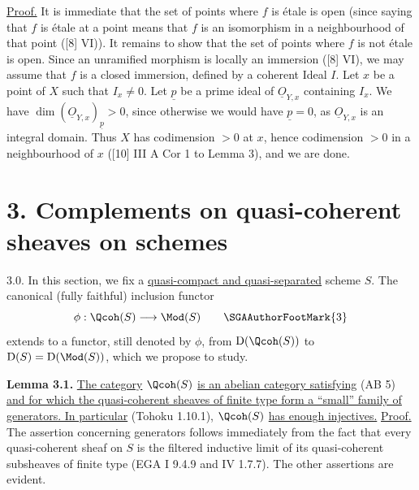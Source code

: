 \uline{Proof.} It is immediate that the set of points where $f$ is étale is open (since saying that $f$ is étale at a point means that $f$ is an isomorphism in a neighbourhood of that point ([8] VI)). It remains to show that the set of points where $f$ is not étale is open. Since an unramified morphism is locally an immersion ([8] VI), we may assume that $f$ is a closed immersion, defined by a coherent Ideal $I$. Let $x$ be a point of $X$ such that $I_x\ne0$. Let $\underline{p}$ be a prime ideal of $\underline{O}_{Y,x}$ containing $I_x$. We have $\dim(\underline{O}_{Y,x})_{\underline{p}}>0$, since otherwise we would have $\underline{p}=0$, as $\underline{O}_{Y,x}$ is an integral domain. Thus $X$ has codimension $>0$ at $x$, hence codimension $>0$ in a neighbourhood of $x$ ([10] III A Cor 1 to Lemma 3), and we are done.

\section*{3. Complements on quasi-coherent sheaves on schemes\protect{}}

3.0. In this section, we fix a \uline{quasi-compact and quasi-separated} scheme $S$. The canonical (fully faithful) inclusion functor
\[
 \phi:\Qcoh(S)\longrightarrow\Mod(S)\qquad\text{\SGAAuthorFootMark{3}}
\]
extends to a functor, still denoted by $\phi$, from $\mathrm D(\Qcoh(S))$ to $\mathrm D(S)=\mathrm D(\Mod(S))$, which we propose to study.

\textbf{Lemma 3.1.} \uline{The category} $\Qcoh(S)$ \uline{is an abelian category satisfying} (AB 5) \uline{and for which the quasi-coherent sheaves of finite type form a \textquotedblleft small\textquotedblright{} family of generators. In particular} (Tohoku 1.10.1), $\Qcoh(S)$ \uline{has enough injectives.}
%
\uline{Proof.} The assertion concerning generators follows immediately from the fact that every quasi-coherent sheaf on $S$ is the filtered inductive limit of its quasi-coherent subsheaves of finite type (EGA I 9.4.9 and IV 1.7.7). The other assertions are evident.

